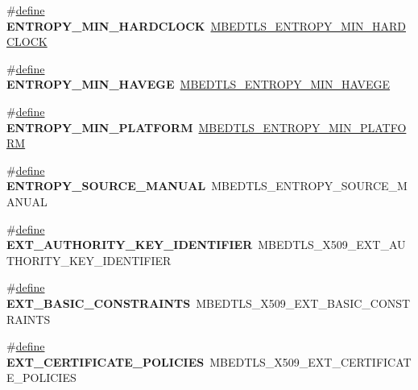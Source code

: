 \begin{DoxyCompactItemize}
\#\hyperlink{structdefine}{define} {\bfseries E\+N\+T\+R\+O\+P\+Y\+\_\+\+M\+I\+N\+\_\+\+H\+A\+R\+D\+C\+L\+O\+CK}~\hyperlink{entropy__poll_8h_a65c4fbcd7f6e3617f3e595f267258475}{M\+B\+E\+D\+T\+L\+S\+\_\+\+E\+N\+T\+R\+O\+P\+Y\+\_\+\+M\+I\+N\+\_\+\+H\+A\+R\+D\+C\+L\+O\+CK}
\item 
\mbox{\label{compat-1_83_8h_a99bec0aa7de17714859f1d2c2e547c64}} 
\#\hyperlink{structdefine}{define} {\bfseries E\+N\+T\+R\+O\+P\+Y\+\_\+\+M\+I\+N\+\_\+\+H\+A\+V\+E\+GE}~\hyperlink{entropy__poll_8h_a7d41a7970cd0a899aa8528ec1b95aa36}{M\+B\+E\+D\+T\+L\+S\+\_\+\+E\+N\+T\+R\+O\+P\+Y\+\_\+\+M\+I\+N\+\_\+\+H\+A\+V\+E\+GE}
\item 
\mbox{\label{compat-1_83_8h_ac9a6394d9503c8045054a048b0d7cc0d}} 
\#\hyperlink{structdefine}{define} {\bfseries E\+N\+T\+R\+O\+P\+Y\+\_\+\+M\+I\+N\+\_\+\+P\+L\+A\+T\+F\+O\+RM}~\hyperlink{entropy__poll_8h_a7bd03568eb4ced60c878a6adc46aa407}{M\+B\+E\+D\+T\+L\+S\+\_\+\+E\+N\+T\+R\+O\+P\+Y\+\_\+\+M\+I\+N\+\_\+\+P\+L\+A\+T\+F\+O\+RM}
\item 
\mbox{\label{compat-1_83_8h_a8c3a8b8e81c2b4e3c03d3704029bca39}} 
\#\hyperlink{structdefine}{define} {\bfseries E\+N\+T\+R\+O\+P\+Y\+\_\+\+S\+O\+U\+R\+C\+E\+\_\+\+M\+A\+N\+U\+AL}~M\+B\+E\+D\+T\+L\+S\+\_\+\+E\+N\+T\+R\+O\+P\+Y\+\_\+\+S\+O\+U\+R\+C\+E\+\_\+\+M\+A\+N\+U\+AL
\item 
\mbox{\label{compat-1_83_8h_a428fea8893da65b2dcfc971ead294c67}} 
\#\hyperlink{structdefine}{define} {\bfseries E\+X\+T\+\_\+\+A\+U\+T\+H\+O\+R\+I\+T\+Y\+\_\+\+K\+E\+Y\+\_\+\+I\+D\+E\+N\+T\+I\+F\+I\+ER}~M\+B\+E\+D\+T\+L\+S\+\_\+\+X509\+\_\+\+E\+X\+T\+\_\+\+A\+U\+T\+H\+O\+R\+I\+T\+Y\+\_\+\+K\+E\+Y\+\_\+\+I\+D\+E\+N\+T\+I\+F\+I\+ER
\item 
\mbox{\label{compat-1_83_8h_a7813d9ed1f4ee1f122782d31f459d989}} 
\#\hyperlink{structdefine}{define} {\bfseries E\+X\+T\+\_\+\+B\+A\+S\+I\+C\+\_\+\+C\+O\+N\+S\+T\+R\+A\+I\+N\+TS}~M\+B\+E\+D\+T\+L\+S\+\_\+\+X509\+\_\+\+E\+X\+T\+\_\+\+B\+A\+S\+I\+C\+\_\+\+C\+O\+N\+S\+T\+R\+A\+I\+N\+TS
\item 
\mbox{\label{compat-1_83_8h_a89bed13c425f192607aac9712adc5655}} 
\#\hyperlink{structdefine}{define} {\bfseries E\+X\+T\+\_\+\+C\+E\+R\+T\+I\+F\+I\+C\+A\+T\+E\+\_\+\+P\+O\+L\+I\+C\+I\+ES}~M\+B\+E\+D\+T\+L\+S\+\_\+\+X509\+\_\+\+E\+X\+T\+\_\+\+C\+E\+R\+T\+I\+F\+I\+C\+A\+T\+E\+\_\+\+P\+O\+L\+I\+C\+I\+ES

\end{DoxyCompactItemize}
